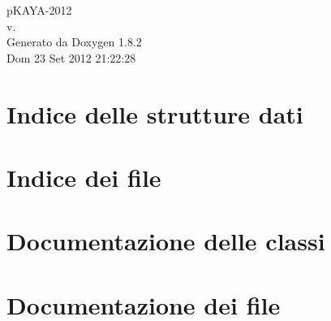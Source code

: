 \documentclass{book}
\begin{document}
\hypersetup{pageanchor=false,citecolor=blue}
\begin{titlepage}
\vspace*{7cm}
\begin{center}
{\Large p\-K\-A\-Y\-A-\/2012 \\[1ex]\large v. }\\
\vspace*{1cm}
{\large Generato da Doxygen 1.8.2}\\
\vspace*{0.5cm}
{\small Dom 23 Set 2012 21:22:28}\\
\end{center}
\end{titlepage}
\clearemptydoublepage
{}
\tableofcontents
\clearemptydoublepage
{}
\hypersetup{pageanchor=true,citecolor=blue}
\chapter{Indice delle strutture dati}

\chapter{Indice dei file}

\chapter{Documentazione delle classi}













\chapter{Documentazione dei file}
























\printindex
\end{document}
